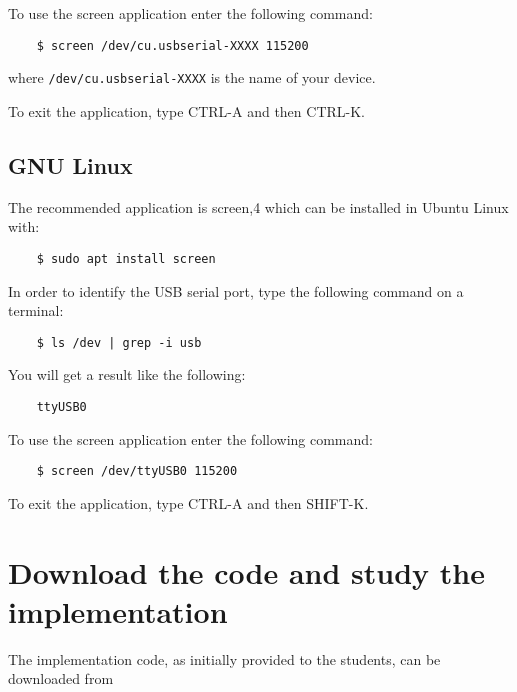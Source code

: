 To use the screen application enter the following command:

\begin{BVerbatim}
	$ screen /dev/cu.usbserial-XXXX 115200
\end{BVerbatim}
	
where \texttt{/dev/cu.usbserial-XXXX} is the name of your device.

To exit the application, type CTRL-A and then CTRL-K.

\subsection{GNU Linux}

The recommended application is screen,4 which can be installed in Ubuntu Linux with:

\begin{BVerbatim}
	$ sudo apt install screen
\end{BVerbatim}

In order to identify the USB serial port, type the following command on a terminal:

\begin{BVerbatim}
	$ ls /dev | grep -i usb
\end{BVerbatim}

You will get a result like the following:

\begin{BVerbatim}
	ttyUSB0
\end{BVerbatim}

To use the screen application enter the following command:

\begin{BVerbatim}
	$ screen /dev/ttyUSB0 115200
\end{BVerbatim}

To exit the application, type CTRL-A and then SHIFT-K.

\section{Download the code and study the implementation}

The implementation code, as initially provided to the students, can be downloaded from

\begin{center}
	\begin{tcolorbox}[width=0.6\textwidth,
		boxsep=0pt,
		left=0pt,
		right=0pt,
		top=5pt,
		]
		\centering
	\end{tcolorbox}
\end{center}
 
